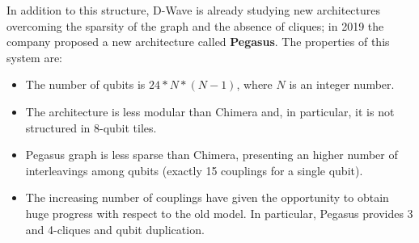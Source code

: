 In addition to this structure, D-Wave is already studying new architectures overcoming the sparsity of the graph and the absence of cliques; in 2019 the company proposed a new architecture called \textbf{Pegasus}. The properties of this system are:

\begin{itemize}
    \item The number of qubits is $24*N*(N-1)$, where $N$ is an integer number.
    \item The architecture is less modular than Chimera and, in particular, it is not structured in 8-qubit tiles.
    \item Pegasus graph is less sparse than Chimera, presenting an higher number of interleavings among qubits (exactly 15 couplings for a single qubit).
    \item The increasing number of couplings have given the opportunity to obtain huge progress with respect to the old model. In particular, Pegasus provides 3 and 4-cliques and qubit duplication.
\end{itemize}

